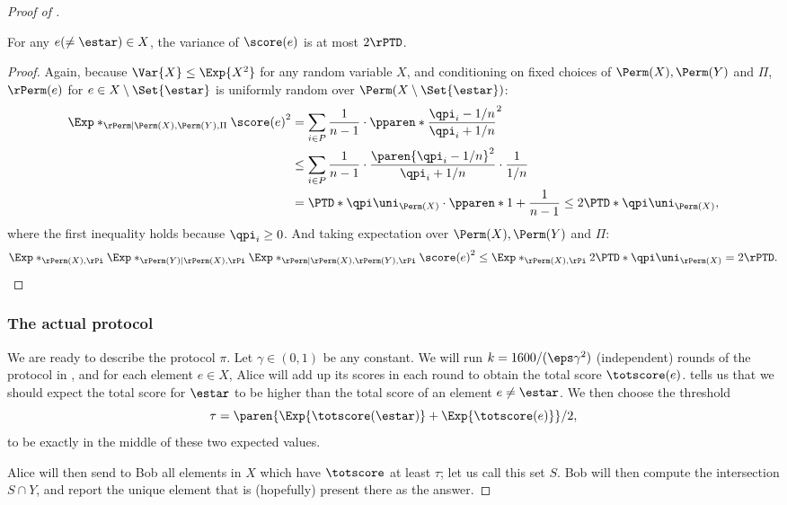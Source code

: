 \begin{proof}[Proof of ]
\begin{claim}\label{clm:variance-score-other}
  For any $e (\neq \estar) \in X$, the variance of $\score(e)$ is at most
  $2\rPTD$.
\end{claim}

\begin{proof}
  Again, because $\Var{X} \leq \Exp{X^2}$ for any random variable $X$, and
  conditioning on fixed choices of $\Perm(X), \Perm(Y)$ and $\Pi$,
  $\rPerm(e)$ for $e \in X \setminus \Set{\estar}$ is uniformly random over
  $\Perm(X \setminus \Set{\estar})$:
  \begin{align*}
    \Exp*_{\rPerm \mid \Perm(X), \Perm(Y), \Pi}{{\score(e)}^2}
    &= \sum_{i \in P} \frac 1{n - 1}
    \cdot \pparen*{\frac {\qpi_i - 1 / n}{\qpi_i + 1 / n}}^2\\
    &\leq \sum_{i \in P} \frac 1{n - 1}
    \cdot \frac{\paren{\qpi_i - 1/n}^2}{\qpi_i + 1 / n} \cdot \frac 1{1 / n}\\
    &= \PTD*{\qpi}{\uni_{\Perm(X)}} \cdot \pparen*{1 + \frac 1{n - 1}}
    \leq 2\PTD*{\qpi}{ \uni_{\Perm(X)}},
  \end{align*}
  where the first inequality holds because $\qpi_i \geq 0$.
  And taking expectation over $\Perm(X), \Perm(Y)$ and $\Pi$:
  \[
    \Exp*_{\rPerm(X), \rPi}{
      \Exp*_{\rPerm(Y) \mid \rPerm(X), \rPi} {
        \Exp*_{\rPerm \mid \rPerm(X), \rPerm(Y), \rPi}{{\score(e)}^2}
      }
    }
    \leq
    \Exp*_{\rPerm(X), \rPi}{
      2\PTD*{\qpi}{\uni_{\rPerm(X)}}
    }
    = 2\rPTD.
  \]
\end{proof}

\subsubsection{The actual protocol}\label{subsec:actual-protocol}

We are ready to describe the protocol $\pi$.
Let $\gamma \in (0,1)$ be any constant.
We will run $k = 1600 / (\eps \gamma^2)$ (independent) rounds of the
protocol in , and for each element $e \in X$,
Alice will add up its scores in each round to obtain the total score $\totscore(e)$.  tells us that we should expect the total score for $\estar$ to be higher than the total score of an element $e \neq \estar$.
We then choose the threshold
\[
  \tau = \paren{\Exp{\totscore(\estar)} + \Exp{\totscore(e)}} / 2,
\]
to be exactly in the middle of these two expected values.

Alice will then send to Bob all elements in $X$ which have $\totscore$ at least
$\tau$; let us call this set $S$.
Bob will then compute the intersection $S \cap Y$, and report the unique element
that is (hopefully) present there as the answer.


\end{proof}
